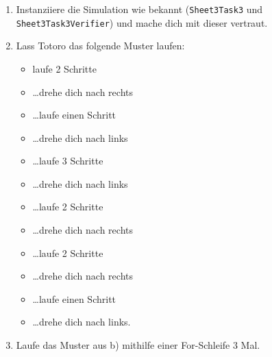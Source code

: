 
\begin{enumerate}
	\item
	Instanziiere die Simulation wie bekannt (\lstinline{Sheet3Task3} und \lstinline{Sheet3Task3Verifier}) und mache dich mit dieser vertraut.
	\item
		Lass Totoro das folgende Muster laufen:
		\begin{itemize}
			\item[] laufe 2 Schritte
			\item[] …drehe dich nach rechts
			\item[] …laufe einen Schritt
			\item[] …drehe dich nach links
			\item[] …laufe 3 Schritte
			\item[] …drehe dich nach links
			\item[] …laufe 2 Schritte
			\item[] …drehe dich nach rechts
			\item[] …laufe 2 Schritte
			\item[] …drehe dich nach rechts
			\item[] …laufe einen Schritt
			\item[] …drehe dich nach links.
		\end{itemize}
	\item
		Laufe das Muster aus b) mithilfe einer For-Schleife 3 Mal.
\end{enumerate}


